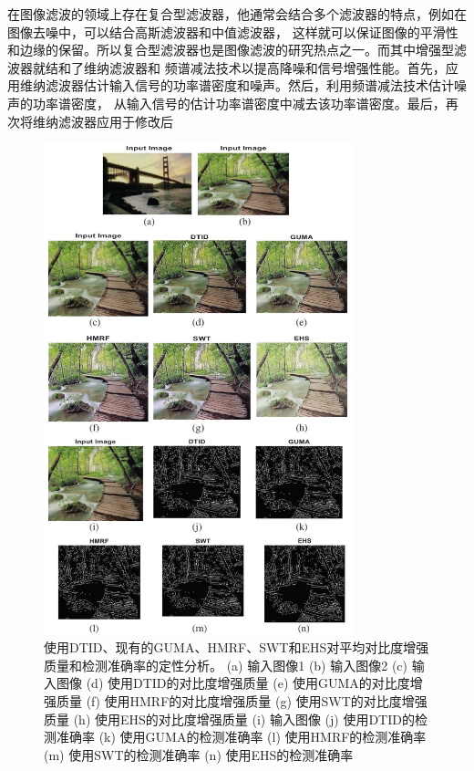 在图像滤波的领域上存在复合型滤波器，他通常会结合多个滤波器的特点，例如在图像去噪中，可以结合高斯滤波器和中值滤波器，
这样就可以保证图像的平滑性和边缘的保留。所以复合型滤波器也是图像滤波的研究热点之一。而其中增强型滤波器就结和了维纳滤波器和
频谱减法技术以提高降噪和信号增强性能。首先，应用维纳滤波器估计输入信号的功率谱密度和噪声。然后，利用频谱减法技术估计噪声的功率谱密度，
从输入信号的估计功率谱密度中减去该功率谱密度。最后，再次将维纳滤波器应用于修改后

\begin{figure}[htbp]
	\begin{center}
	    \vspace{10pt} %
		\includegraphics[width = 0.8\textwidth]{images/03.eps}
		\caption{使用DTID、现有的GUMA、HMRF、SWT和EHS对平均对比度增强质量和检测准确率的定性分析。
        (a) 输入图像1 (b) 输入图像2 (c) 输入图像 (d) 使用DTID的对比度增强质量 (e) 使用GUMA的对比度增强质量 
        (f) 使用HMRF的对比度增强质量 (g) 使用SWT的对比度增强质量 (h) 使用EHS的对比度增强质量 
        (i) 输入图像 (j) 使用DTID的检测准确率 (k) 使用GUMA的检测准确率 (l) 使用HMRF的检测准确率 
        (m) 使用SWT的检测准确率 (n) 使用EHS的检测准确率} 
		\label{03} %
	\end{center}
\end{figure}


